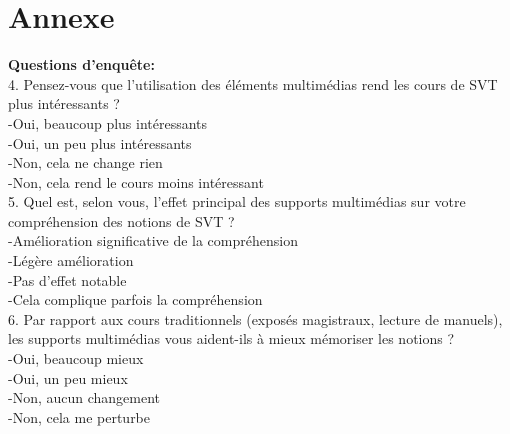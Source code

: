\documentclass[a4paper,oneside,12pt]{book}
\renewcommand{\bibname}{%
	Bibliographie et webographie}
\renewcommand{\bibname}{%
		Bibliographie et webographie}}
\begin{document}
\newpage





           
\renewcommand{\bibname}{Références bibliographiques et webographiques}



%
%




\nocite{ref1}
\nocite{xamp}
\nocite{javascripte}

\appendix
\newpage
\pagestyle{fancyplain}

\chapter*{Annexe}
{\large\textbf{Questions d'enqu\^ete:}}\\








4. Pensez-vous que l’utilisation des éléments multimédias rend les cours de SVT plus intéressants ?\\
-Oui, beaucoup plus intéressants\\
-Oui, un peu plus intéressants\\
-Non, cela ne change rien\\
-Non, cela rend le cours moins intéressant\\

5. Quel est, selon vous, l’effet principal des supports multimédias sur votre compréhension des notions de SVT ?\\
-Amélioration significative de la compréhension\\
-Légère amélioration\\
-Pas d’effet notable\\
-Cela complique parfois la compréhension\\

6. Par rapport aux cours traditionnels (exposés magistraux, lecture de manuels), les supports multimédias vous aident-ils à mieux mémoriser les notions ?\\
-Oui, beaucoup mieux\\
-Oui, un peu mieux\\
-Non, aucun changement\\
-Non, cela me perturbe\\
\end{document}
